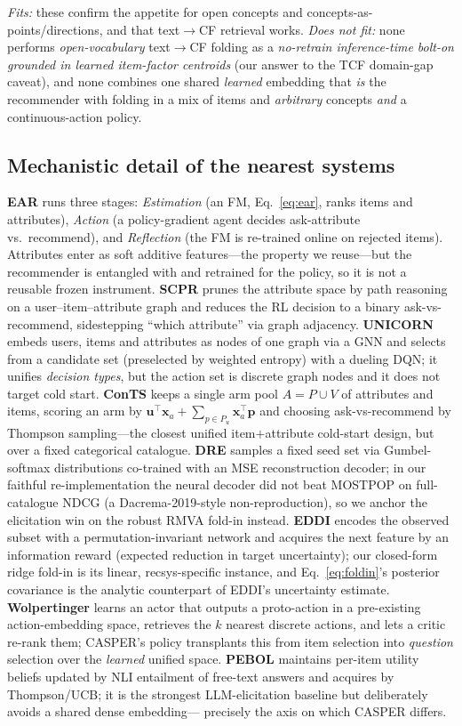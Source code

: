 \documentclass[11pt]{article}
\newcommand{\uu}{\mathbf{u}}
\begin{document}
\emph{Fits:} these confirm the appetite for open concepts and concepts-as-points/directions, and that text$\to$CF
retrieval works. \emph{Does not fit:} none performs \emph{open-vocabulary} text$\to$CF folding as a \emph{no-retrain
inference-time bolt-on grounded in learned item-factor centroids} (our answer to the TCF domain-gap caveat), and
none combines one shared \emph{learned} embedding that \emph{is} the recommender with folding in a mix of items and
\emph{arbitrary} concepts \emph{and} a continuous-action policy.

\subsection{Mechanistic detail of the nearest systems}
\textbf{EAR} runs three stages: \emph{Estimation} (an FM, Eq.~\eqref{eq:ear}, ranks items and attributes),
\emph{Action} (a policy-gradient agent decides ask-attribute vs.\ recommend), and \emph{Reflection} (the FM is
re-trained online on rejected items). Attributes enter as soft additive features---the property we reuse---but the
recommender is entangled with and retrained for the policy, so it is not a reusable frozen instrument.
\textbf{SCPR} prunes the attribute space by path reasoning on a user--item--attribute graph and reduces the RL
decision to a binary ask-vs-recommend, sidestepping ``which attribute'' via graph adjacency. \textbf{UNICORN}
embeds users, items and attributes as nodes of one graph via a GNN and selects from a candidate set (preselected by
weighted entropy) with a dueling DQN; it unifies \emph{decision types}, but the action set is discrete graph nodes
and it does not target cold start. \textbf{ConTS} keeps a single arm pool $A=P\cup V$ of attributes and items,
scoring an arm by $\uu^\top\mathbf x_a+\sum_{p\in P_u}\mathbf x_a^\top\mathbf p$ and choosing ask-vs-recommend by
Thompson sampling---the closest unified item$+$attribute cold-start design, but over a fixed categorical
catalogue. \textbf{DRE} samples a fixed seed set via Gumbel-softmax distributions co-trained with an MSE
reconstruction decoder; in our faithful re-implementation the neural decoder did not beat MOSTPOP on
full-catalogue NDCG (a Dacrema-2019-style non-reproduction), so we anchor the elicitation win on the robust RMVA
fold-in instead. \textbf{EDDI} encodes the observed subset with a permutation-invariant network and acquires the
next feature by an information reward (expected reduction in target uncertainty); our closed-form ridge fold-in is
its linear, recsys-specific instance, and Eq.~\eqref{eq:foldin}'s posterior covariance is the analytic counterpart
of EDDI's uncertainty estimate. \textbf{Wolpertinger} learns an actor that outputs a proto-action in a pre-existing
action-embedding space, retrieves the $k$ nearest discrete actions, and lets a critic re-rank them; CASPER's policy
transplants this from item selection into \emph{question} selection over the \emph{learned} unified space.
\textbf{PEBOL} maintains per-item utility beliefs updated by NLI entailment of free-text answers and acquires by
Thompson/UCB; it is the strongest LLM-elicitation baseline but deliberately avoids a shared dense embedding---
precisely the axis on which CASPER differs.
\end{document}
